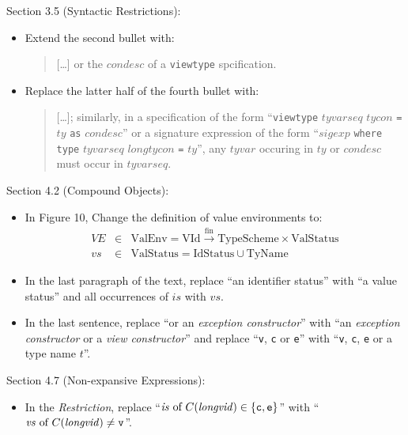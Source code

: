\documentclass[twoside,titlepage]{article}
\newcommand{\finto}{\ensuremath{\xrightarrow{\text{fin}}}}
\begin{document}
\begin{appendix}
Section 3.5 (Syntactic Restrictions):
\begin{itemize}
\item Extend the second bullet with:
  \begin{quote}
  [\dots] or the $\mathit{condesc}$ of a {\tt viewtype} spcification.
  \end{quote}

\item Replace the latter half of the fourth bullet with:
  \begin{quote}
  [\dots]; similarly, in a specification of the form ``{\tt{viewtype}} $\mathit{tyvarseq}$ $\mathit{tycon}$ {\tt=} $\mathit{ty}$ {\tt as} $\mathit{condesc}$'' or a signature expression of the form ``$\mathit{sigexp}$ {\tt where} {\tt type} $\mathit{tyvarseq}$ $\mathit{longtycon}$ {\tt=} $\mathit{ty}$'', any $\mathit{tyvar}$ occuring in $\mathit{ty}$ or $\mathit{condesc}$ must occur in $\mathit{tyvarseq}$.
  \end{quote}
\end{itemize}

Section 4.2 (Compound Objects):
\begin{itemize}
\item In Figure 10, Change the definition of value environments to:
  \begin{eqnarray*}
  \mathit{VE} &\in& \mbox{ValEnv} = \mbox{VId} \finto \mbox{TypeScheme} \times \mbox{ValStatus} \\
  \mathit{vs} &\in& \mbox{ValStatus} = \mbox{IdStatus} \cup \mbox{TyName}
  \end{eqnarray*}

\item In the last paragraph of the text, replace ``an identifier status'' with ``a value status'' and all occurrences of $\mathit{is}$ with $\mathit{vs}$.

\item In the last sentence, replace ``or an \emph{exception constructor}'' with ``an \emph{exception constructor} or a \emph{view constructor}'' and replace ``{\tt{v}}, {\tt c} or {\tt e}'' with ``{\tt{v}}, {\tt c}, {\tt e} or a type name $t$''.
\end{itemize}

Section 4.7 (Non-expansive Expressions):
\begin{itemize}
\item In the \emph{Restriction}, replace ``$\mathit{is}~\mbox{of}~C(\mathit{longvid}) \in \{{\tt{c}},{\tt{e}}\}$'' with ``$\mathit{vs}~\mbox{of}~C(\mathit{longvid}) \neq {\tt{v}}$''.
\end{itemize}


\end{appendix}
\end{document}
